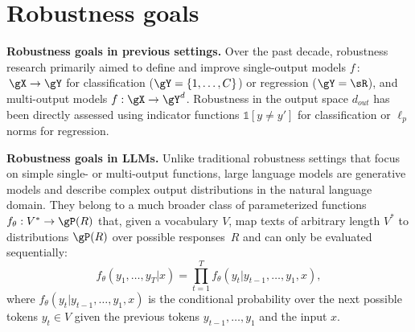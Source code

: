 



\vspace{-10pt}
\section{Robustness goals}\label{sec:pos-goals}


\textbf{Robustness goals in previous settings.}
Over the past decade, robustness research primarily aimed to define and improve single-output models $f\,$$:$$\, \gX \rightarrow \gY$ for classification ($\gY = \{1, \ldots, C\}$) or regression ($\gY=\sR$), and multi-output models $f : \gX \rightarrow \gY^d$. %
Robustness in the output space $d_{out}$ has been directly assessed using indicator functions $\mathds{1}[y \neq y']$ for classification or $\ell_p$ norms for regression.

\textbf{Robustness goals in LLMs.}
Unlike traditional robustness settings that focus on simple single- or multi-output functions, large language models are generative models and describe complex output distributions in the natural language domain. They belong to a much broader class of parameterized functions $f_\theta: V^* \rightarrow \gP(R)$ that, given a vocabulary $V$, map texts of arbitrary length $V^*$ to distributions $\gP(R)$ over possible responses~$R$ and can only be evaluated sequentially: 
\vspace{-0.325cm}
\[
f_\theta(y_1, \ldots, y_T | x) = \prod_{t=1}^T f_\theta(y_t | y_{t-1}, \ldots, y_1, x),
\]
where $f_\theta(y_t| y_{t-1}, \ldots, y_1, x)$ is the conditional probability over the next possible tokens $y_t\in V$ given the previous tokens $y_{t-1}, \ldots, y_1$ and the input $x$. 

